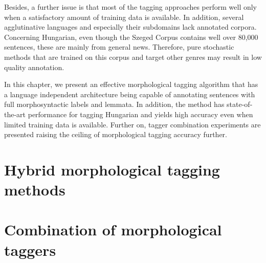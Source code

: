 Besides, a further issue is that most of the tagging approaches perform well only when a satisfactory amount of training data is available. 
In addition, several agglutinative languages and especially their subdomains lack annotated corpora. 
Concerning Hungarian, even though the Szeged Corpus contains well over 80,000 sentences, these are mainly from general news. 
Therefore, pure stochastic methods that are trained on this corpus and target other genres may result in low quality annotation. 

In this chapter, we present an effective morphological tagging algorithm that has a language independent architecture being capable of annotating sentences with full morphosyntactic labels and lemmata. 
In addition, the method has state-of-the-art performance for tagging Hungarian and yields high accuracy even when limited training data is available. 
Further on, tagger combination experiments are presented raising the ceiling of morphological tagging accuracy further. 

\section{Hybrid morphological tagging methods}\label{sec:tagging}



\section{Combination of morphological taggers}\label{sec:combination}


 
